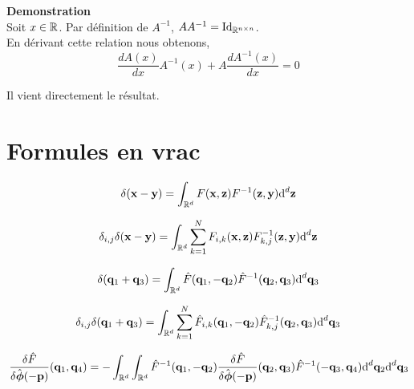 \documentclass[10pt]{article}
\begin{document}
\textbf{Demonstration}\\
Soit $x \in \mathbb{R}$.
Par définition de $A^{-1}$, $AA^{-1} = \text{Id}_{\mathbb{R}^{n\times n}}$.\\
En dérivant cette relation nous obtenons, 
\begin{equation}
  \frac{dA(x)}{dx}A^{-1}(x) + A\frac{dA^{-1}(x)}{dx} = 0
\end{equation}

Il vient directement le résultat.



\section{Formules en vrac}

\begin{equation}
   \delta({\bf x} - {\bf y}) = \int_{\mathbb{R}^d} F({\bf x}, {\bf z}) F^{-1}({\bf z}, {\bf y}) \text{d}^d {\bf z}
\end{equation}

\begin{equation}
   \delta_{i,j} \delta({\bf x} - {\bf y}) = \int_{\mathbb{R}^d} \sum_{k=1}^{N} F_{i,k}({\bf x}, {\bf z}) F^{-1}_{k,j}({\bf z}, {\bf y}) \text{d}^d {\bf z}
\end{equation}

\begin{equation}
   \delta({\bf q}_1 +{\bf q}_3) = \int_{\mathbb{R}^d} \hat{F}({\bf q}_1, -{\bf q}_2) \hat{F}^{-1}({\bf q}_2, {\bf q}_3) \text{d}^d {\bf q}_3
\end{equation}


\begin{equation}
   \delta_{i,j}\delta({\bf q}_1 +{\bf q}_3) = \int_{\mathbb{R}^d} \sum_{k=1}^{N} \hat{F}_{i,k}({\bf q}_1, -{\bf q}_2) \hat{F}^{-1}_{k,j}({\bf q}_2, {\bf q}_3) \text{d}^d {\bf q}_3
\end{equation}

\begin{equation}
   \frac{\delta \hat{F}}{\delta \hat{\boldsymbol{ \phi}}(-{\bf p})}({\bf q}_1, {\bf q}_4) = - \int_{\mathbb{R}^d} \int_{\mathbb{R}^d} \hat{F}^{-1}({\bf q}_1, -{\bf q}_2) \frac{\delta \hat{F}}{\delta \hat{\boldsymbol{ \phi}}(-{\bf p})}({\bf q}_2, {\bf q}_3) \hat{F}^{-1}(-{\bf q}_3, {\bf q}_4) \text{d}^d {\bf q}_2 \text{d}^d {\bf q}_3
\end{equation}



\pagebreak
\end{document}
